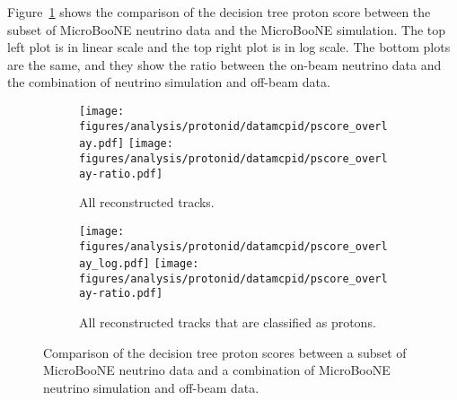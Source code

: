     Figure~\ref{fig:pidscores} shows the comparison of the decision tree proton
    score between the subset of MicroBooNE neutrino data and the MicroBooNE
    simulation. The top left plot is in linear scale and the top right plot is
    in log scale. The bottom plots are the same, and they show the ratio
    between the on-beam neutrino data and the combination of neutrino
    simulation and off-beam data.
    \begin{figure}[h]
      \centering
      \begin{subfigure}[t]{2.5in}
        \texttt{[image: figures/analysis/protonid/datamcpid/pscore\_overlay.pdf]}
        \texttt{[image: figures/analysis/protonid/datamcpid/pscore\_overlay-ratio.pdf]}
        \caption{All reconstructed tracks.}
      \end{subfigure}
      \hspace{2pt}
      \begin{subfigure}[t]{2.5in}
        \texttt{[image: figures/analysis/protonid/datamcpid/pscore\_overlay\_log.pdf]}
        \texttt{[image: figures/analysis/protonid/datamcpid/pscore\_overlay-ratio.pdf]}
        \caption{All reconstructed tracks that are classified as protons.}
      \end{subfigure}
      \caption{Comparison of the decision tree proton scores between a subset
      of MicroBooNE neutrino data and a combination of MicroBooNE neutrino
      simulation and off-beam data.}
      \label{fig:pidscores}
    \end{figure}


